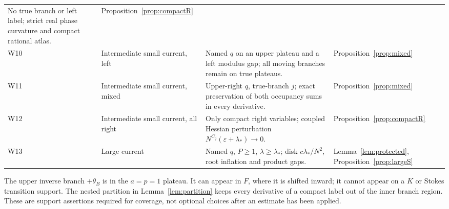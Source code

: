 \documentclass[11pt]{article}
\numberwithin{equation}{section}
\theoremstyle{definition}
\newcommand{\eps}{\varepsilon}
\begin{document}
\begin{longtable}{>{\raggedright\arraybackslash}p{}>{\raggedright\arraybackslash}p{}>{\raggedright\arraybackslash}p{}>{\raggedright\arraybackslash}p{}}
No true branch or left label; strict real phase curvature
and compact rational atlas. & Proposition~\ref{prop:compactR}\\
W10 & Intermediate small current, left &
Named \(q\) on an upper plateau and a left modulus gap;
all moving branches remain on true plateaus. &
Proposition~\ref{prop:mixed}\\
W11 & Intermediate small current, mixed &
Upper-right \(q\), true-branch \(j\); exact preservation of
both occupancy sums in every derivative. &
Proposition~\ref{prop:mixed}\\
W12 & Intermediate small current, all right &
Only compact right variables; coupled Hessian perturbation
\(N^{C_j}(\eps+\lambda_*)\to0\). &
Proposition~\ref{prop:compactR}\\
W13 & Large current &
Named \(q\), \(P\ge1\), \(\lambda\ge\lambda_*\);
disk \(c\lambda_*/N^2\), root inflation and product gaps. &
Lemma~\ref{lem:protected}, Proposition~\ref{prop:largeS}\\
\bottomrule
\end{longtable}
\setlength{\tabcolsep}{6pt}
\normalsize

The upper inverse branch \(+\theta_B\) is in the \(a=p=1\)
plateau. It can appear in \(F\), where it is shifted inward;
it cannot appear on a \(K\) or Stokes transition support.
The nested partition in Lemma~\ref{lem:partition} keeps every
derivative of a compact label out of the inner branch region.
These are support assertions required for coverage, not
optional choices after an estimate has been applied.
\end{document}
